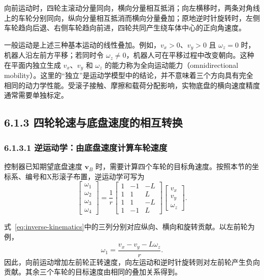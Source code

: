 \documentclass[UTF8,zihao=-4]{ctexart}
\newcommand{\vect}[1]{\bm{#1}}
\begin{document}
向前运动时，四轮主滚动分量同向，横向分量相互抵消；向左横移时，两条对角线上的车轮分别同向，纵向分量相互抵消而横向分量叠加；原地逆时针旋转时，左侧车轮趋向后退、右侧车轮趋向前进，四轮共同产生绕车体中心的正向角速度。

一般运动是上述三种基本运动的线性叠加。例如，$v_x>0$、$v_y>0$ 且 $\omega_z=0$ 时，机器人沿左前方平移；若同时令 $\omega_z\neq0$，机器人可在平移过程中改变朝向。这种在平面内独立生成 $v_x$、$v_y$ 和 $\omega_z$ 的能力称为全向运动能力（omnidirectional mobility）。这里的“独立”是运动学模型中的结论，并不意味着三个方向具有完全相同的动力学性能。受滚子接触、摩擦和载荷分配影响，实物底盘的横向速度精度通常需要单独标定。

\subsection*{6.1.3 四轮轮速与底盘速度的相互转换}

\subsubsection*{6.1.3.1 逆运动学：由底盘速度计算车轮速度}

控制器已知期望底盘速度 $\vect{v}_B$ 时，需要计算四个车轮的目标角速度。按照本节的坐标系、编号和X形滚子布置，逆运动学可写为
\begin{equation}
  \begin{bmatrix}
    \omega_1\\
    \omega_2\\
    \omega_3\\
    \omega_4
  \end{bmatrix}
  =
  \frac{1}{r}
  \begin{bmatrix}
    1 & -1 & -L\\
    1 &  1 &  L\\
    1 &  1 & -L\\
    1 & -1 &  L
  \end{bmatrix}
  \begin{bmatrix}
    v_x\\
    v_y\\
    \omega_z
  \end{bmatrix}.
  \label{eq:inverse-kinematics}
\end{equation}

式~\eqref{eq:inverse-kinematics}中的三列分别对应纵向、横向和旋转贡献。以左前轮为例，
\begin{equation}
  \omega_1=\frac{v_x-v_y-L\omega_z}{r}.
\end{equation}
因此，向前运动增加左前轮正转速度，向左运动和逆时针旋转则对左前轮产生负向贡献。其余三个车轮的目标速度由相同的叠加关系得到。
\end{document}
